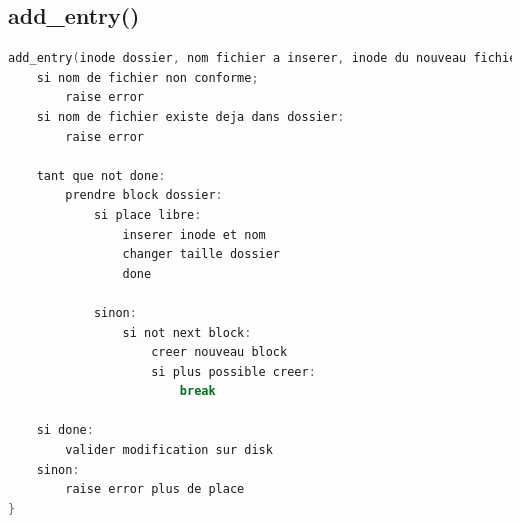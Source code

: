 \documentclass[a4paper,12pt]{article}
\begin{document}
\subsection*{add\_entry()}

\begin{lstlisting}[language=C, caption=pseudo code add\_entry()]
add_entry(inode dossier, nom fichier a inserer, inode du nouveau fichier){
	si nom de fichier non conforme;
		raise error
	si nom de fichier existe deja dans dossier:
		raise error
		
	tant que not done:
		prendre block dossier:
			si place libre:
				inserer inode et nom
				changer taille dossier
				done

			sinon:
				si not next block:
					creer nouveau block
					si plus possible creer:
						break
						
	si done:
		valider modification sur disk
	sinon:
		raise error plus de place
}
\end{lstlisting}
\end{document}
